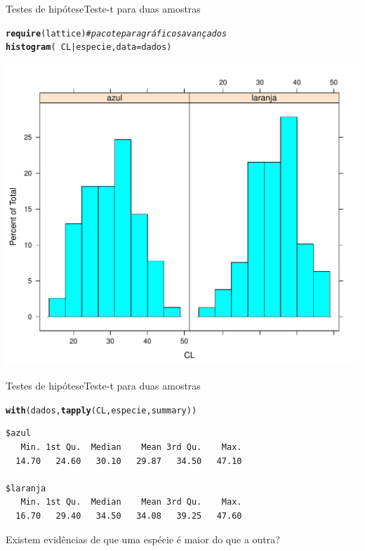 \documentclass[10pt]{beamer}\usepackage[]{graphicx}\usepackage[]{color}
\makeatletter
\newcommand{\hlcom}[1]{\textcolor[rgb]{0.678,0.584,0.686}{\textit{#1}}}%
\newcommand{\hlopt}[1]{\textcolor[rgb]{0,0,0}{#1}}%
\newcommand{\hlstd}[1]{\textcolor[rgb]{0.345,0.345,0.345}{#1}}%
\newcommand{\hlkwc}[1]{\textcolor[rgb]{0.333,0.667,0.333}{#1}}%
\newcommand{\hlkwd}[1]{\textcolor[rgb]{0.737,0.353,0.396}{\textbf{#1}}}%
\newenvironment{kframe}{%
 \def\at@end@of@kframe{}%
 \ifinner\ifhmode%
  \def\at@end@of@kframe{\end{minipage}}%
  \begin{minipage}{\columnwidth}%
 \fi\fi%
 \def\FrameCommand##1{\hskip\@totalleftmargin \hskip-\fboxsep
 \colorbox{shadecolor}{##1}\hskip-\fboxsep
     \hskip-\linewidth \hskip-\@totalleftmargin \hskip\columnwidth}%
 \MakeFramed {\advance\hsize-\width
   \@totalleftmargin\z@ \linewidth\hsize
   \@setminipage}}%
 {\par\unskip\endMakeFramed%
 \at@end@of@kframe}
\newenvironment{knitrout}{}{} %
\theoremstyle{definition}
\makeatother
\begin{document}
\begin{frame}[fragile]{Testes de hipótese}{Teste-t para duas amostras}
\begin{knitrout}\footnotesize
{}\color{fgcolor}\begin{kframe}
\begin{alltt}
\hlkwd{require}\hlstd{(lattice)} \hlcom{# pacote para gráficos avançados}
\hlkwd{histogram}\hlstd{(}\hlopt{~}\hlstd{CL} \hlopt{|} \hlstd{especie,} \hlkwc{data} \hlstd{= dados)}
\end{alltt}
\end{kframe}

{\centering \includegraphics[width=.8\textwidth]{figure/unnamed-chunk-6-1} 

}



\end{knitrout}
\end{frame}

\begin{frame}[fragile]{Testes de hipótese}{Teste-t para duas amostras}
\begin{knitrout}\footnotesize
{}\color{fgcolor}\begin{kframe}
\begin{alltt}
\hlkwd{with}\hlstd{(dados,} \hlkwd{tapply}\hlstd{(CL, especie, summary))}
\end{alltt}
\begin{verbatim}
$azul
   Min. 1st Qu.  Median    Mean 3rd Qu.    Max. 
  14.70   24.60   30.10   29.87   34.50   47.10 

$laranja
   Min. 1st Qu.  Median    Mean 3rd Qu.    Max. 
  16.70   29.40   34.50   34.08   39.25   47.60 
\end{verbatim}
\end{kframe}
\end{knitrout}
Existem evidências de que uma espécie é maior do que a outra?
\end{frame}
\end{document}
